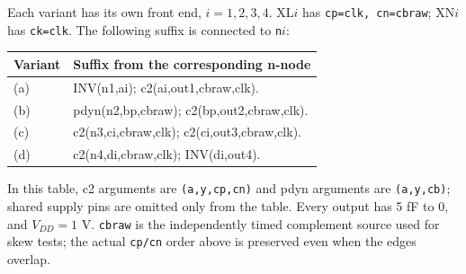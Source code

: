 Each variant has its own front end, \(i=1,2,3,4\). XL\(i\) has \texttt{cp=clk, cn=cbraw}; XN\(i\) has \texttt{ck=clk}. The following suffix is connected to \texttt{n}\(i\):
\begin{center}\small\begin{tabular}{p{.24\linewidth}p{.68\linewidth}}\toprule
Variant & Suffix from the corresponding n-node\\\midrule
(a) & INV(n1,ai); c2(ai,out1,cbraw,clk).\\
(b) & pdyn(n2,bp,cbraw); c2(bp,out2,cbraw,clk).\\
(c) & c2(n3,ci,cbraw,clk); c2(ci,out3,cbraw,clk).\\
(d) & c2(n4,di,cbraw,clk); INV(di,out4).\\
\bottomrule\end{tabular}\end{center}
In this table, c2 arguments are \texttt{(a,y,cp,cn)} and pdyn arguments are \texttt{(a,y,cb)}; shared supply pins are omitted only from the table. Every output has 5 fF to 0, and \(V_{DD}=1\) V. \texttt{cbraw} is the independently timed complement source used for skew tests; the actual \texttt{cp/cn} order above is preserved even when the edges overlap.
\endgroup
